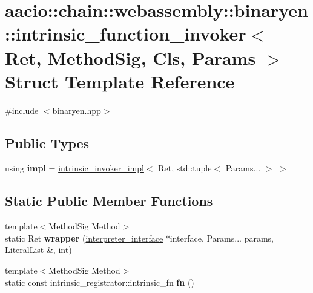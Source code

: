 \hypertarget{structaacio_1_1chain_1_1webassembly_1_1binaryen_1_1intrinsic__function__invoker}{}\section{aacio\+:\+:chain\+:\+:webassembly\+:\+:binaryen\+:\+:intrinsic\+\_\+function\+\_\+invoker$<$ Ret, Method\+Sig, Cls, Params $>$ Struct Template Reference}
\label{structaacio_1_1chain_1_1webassembly_1_1binaryen_1_1intrinsic__function__invoker}


{\ttfamily \#include $<$binaryen.\+hpp$>$}

\subsection*{Public Types}
\begin{DoxyCompactItemize}
\item 
\mbox{\label{structaacio_1_1chain_1_1webassembly_1_1binaryen_1_1intrinsic__function__invoker_a7fdee03e9d6705af69ad821d48082047}} 
using {\bfseries impl} = \mbox{\hyperlink{structaacio_1_1chain_1_1webassembly_1_1binaryen_1_1intrinsic__invoker__impl}{intrinsic\+\_\+invoker\+\_\+impl}}$<$ Ret, std\+::tuple$<$ Params... $>$ $>$
\end{DoxyCompactItemize}
\subsection*{Static Public Member Functions}
\begin{DoxyCompactItemize}
\item 
\mbox{\label{structaacio_1_1chain_1_1webassembly_1_1binaryen_1_1intrinsic__function__invoker_a2a462db9b6e96e3291bdc829c339c97b}} 
{\footnotesize template$<$Method\+Sig Method$>$ }\\static Ret {\bfseries wrapper} (\mbox{\hyperlink{structaacio_1_1chain_1_1webassembly_1_1binaryen_1_1interpreter__interface}{interpreter\+\_\+interface}} $\ast$interface, Params... params, \mbox{\hyperlink{classstd_1_1vector}{Literal\+List}} \&, int)
\item 
\mbox{\label{structaacio_1_1chain_1_1webassembly_1_1binaryen_1_1intrinsic__function__invoker_a88aafd88bd624eea65f1f2cf56b68111}} 
{\footnotesize template$<$Method\+Sig Method$>$ }\\static const intrinsic\+\_\+registrator\+::intrinsic\+\_\+fn {\bfseries fn} ()
\end{DoxyCompactItemize}


